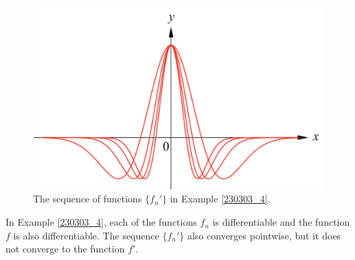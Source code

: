 \begin{figure}[ht]
\centering
\includegraphics[scale=0.18]{Picture55.png}
\caption{The sequence of functions $\{f_n'\}$  in Example \ref{230303_4}.\fa}\label{figure55}
\end{figure}

\begin{highlight}{}
In Example \ref{230303_4}, each of the functions $f_n$ is differentiable and the  function $f$ is also differentiable. The sequence $\{f_n'\}$ also converges pointwise, but it does not converge to the function $f'$.

\end{highlight}

